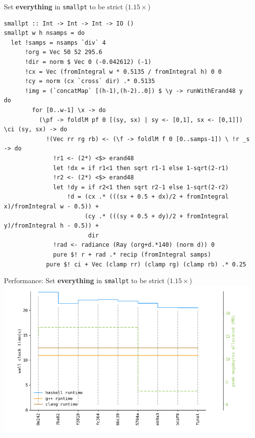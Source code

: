 \documentclass[8pt]{beamer}
\begin{document}
\begin{frame}[fragile]{Set \textbf{everything} in \texttt{smallpt} to be strict ($1.15\times$)}
\begin{verbatim}
smallpt :: Int -> Int -> Int -> IO ()
smallpt w h nsamps = do
  let !samps = nsamps `div` 4
      !org = Vec 50 52 295.6
      !dir = norm $ Vec 0 (-0.042612) (-1)
      !cx = Vec (fromIntegral w * 0.5135 / fromIntegral h) 0 0
      !cy = norm (cx `cross` dir) .* 0.5135
      !img = (`concatMap` [(h-1),(h-2)..0]) $ \y -> runWithErand48 y do
        for [0..w-1] \x -> do
          (\pf -> foldlM pf 0 [(sy, sx) | sy <- [0,1], sx <- [0,1]]) \ci (sy, sx) -> do
            !(Vec rr rg rb) <- (\f -> foldlM f 0 [0..samps-1]) \ !r _s -> do
              !r1 <- (2*) <$> erand48
              let !dx = if r1<1 then sqrt r1-1 else 1-sqrt(2-r1)
              !r2 <- (2*) <$> erand48
              let !dy = if r2<1 then sqrt r2-1 else 1-sqrt(2-r2)
                  !d = (cx .* (((sx + 0.5 + dx)/2 + fromIntegral x)/fromIntegral w - 0.5)) +
                       (cy .* (((sy + 0.5 + dy)/2 + fromIntegral y)/fromIntegral h - 0.5)) + 
                        dir
              !rad <- radiance (Ray (org+d.*140) (norm d)) 0
              pure $! r + rad .* recip (fromIntegral samps)
            pure $! ci + Vec (clamp rr) (clamp rg) (clamp rb) .* 0.25
\end{verbatim}


\end{frame}


\begin{frame}[fragile]{Performance: Set \textbf{everything} in \texttt{smallpt} to be strict ($1.15\times$)}
\includegraphics[height=0.6\textwidth]{perfdata-upto-5caf8-gen.png}
\end{frame}
\end{document}
